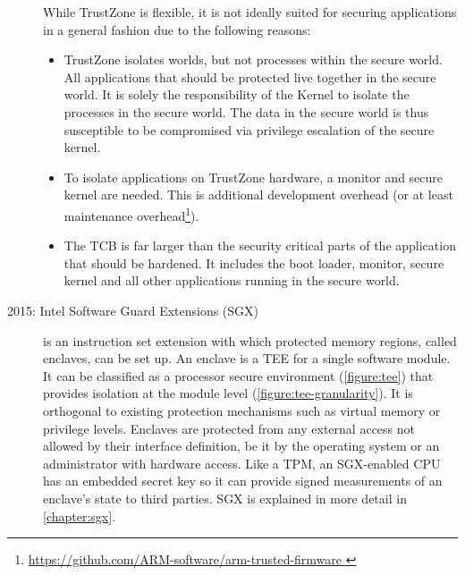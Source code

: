 \begin{description}
While TrustZone is flexible, it is not ideally suited for securing applications in a general fashion due to the following reasons:\label{ID_1692861456}
\begin{itemize}\label{ID_1485312254}
\item TrustZone isolates worlds, but not processes within the secure world. All applications that should be protected live together in the secure world. It is solely the responsibility of the Kernel to isolate the processes in the secure world. The data in the secure world is thus susceptible to be compromised via privilege escalation of the secure kernel.\label{ID_689096711}
\item To isolate applications on TrustZone hardware, a monitor and secure kernel are needed. This is additional development overhead (or at least maintenance overhead\footnote{\url{https://github.com/ARM-software/arm-trusted-firmware }}).\label{ID_179390539}
\item The TCB is far larger than the security critical parts of the application that should be hardened. It includes the boot loader, monitor, secure kernel and all other applications running in the secure world.\label{ID_1738797352}
\end{itemize}\label{ID_1374620071}
\item[2015: Intel Software Guard Extensions (SGX)\footnotemark]\label{ID_1054190841}
\label{ID_229356089}
is an instruction set extension with which protected memory regions, called enclaves, can be set up.\label{ID_61266204}
An enclave is a TEE for a single software module.\label{ID_578161669}
It can be classified as a processor secure environment (\autoref{figure:tee}) that provides isolation at the module level (\autoref{figure:tee-granularity}).\label{ID_1140603591}
It is orthogonal to existing protection mechanisms such as virtual memory or privilege levels.\label{ID_712206334}
Enclaves are protected from any external access not allowed by their interface definition, be it by the operating system or an administrator with hardware access.\cite[]{McKeen2013}\label{ID_1686776308}
Like a TPM, an SGX-enabled CPU has an embedded secret key so it can provide signed measurements of an enclave's state to third parties.\cite[]{c}\label{ID_1516650013}
SGX is explained in more detail in \autoref{chapter:sgx}.\label{ID_877492617}


\end{description}
